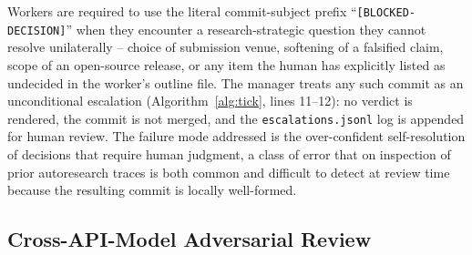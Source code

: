 Workers are required to use the literal commit-subject prefix
``\texttt{[BLOCKED-DECISION]}'' when they encounter a research-strategic
question they cannot resolve unilaterally -- choice of submission
venue, softening of a falsified claim, scope of an open-source
release, or any item the human has explicitly listed as undecided in
the worker's outline file. The manager treats any such commit as an
unconditional escalation (Algorithm~\ref{alg:tick}, lines 11--12): no
verdict is rendered, the commit is not merged, and the
\texttt{escalations.jsonl} log is appended for human review. The failure
mode addressed is the over-confident self-resolution of decisions that
require human judgment, a class of error that on inspection of prior
autoresearch traces is both common and difficult to detect at review
time because the resulting commit is locally well-formed.

\subsection{Cross-API-Model Adversarial Review}
\label{sec:discipline-crossmodel}


